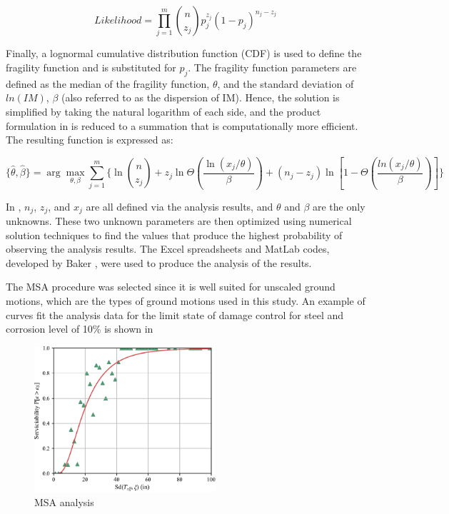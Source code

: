 \begin{equation}
   Likelihood=\prod_{j=1}^{m} \binom{n}{z_{j}}p_{j}^{z_{j}}(1-p_{j})^{n_{j}-z_{j}} 
   \label{eq:likelihood_MSA}
\end{equation}

Finally, a lognormal cumulative distribution function (CDF) is used to define the fragility function and is substituted for $p_j$. The fragility function parameters are defined as the median of the fragility function, $\theta$, and the standard deviation of $ln(IM)$, $\beta$ (also referred to as the dispersion of IM). Hence, the solution is simplified by taking the natural logarithm of each side, and the product formulation in is reduced to a summation that is computationally more efficient. The resulting function is expressed as:

\begin{equation}
  \{\hat{\theta},\hat{\beta}\}=\arg \max_{\theta,\beta} \sum_{j=1}^{m} \bigg\{\ln\binom{n}{z_{j}} +z_{j}\ln\Theta\left(\frac{\ln(x_{j}/\theta)}{\beta}\right) + (n_{j}-z_{j})\ln\left[1-\Theta\left(\frac{ln(x_{j}/\theta)}{\beta}\right)\right]\bigg\} 
  \label{eq:hat_theta_beta_MSA}
\end{equation}

In , $n_j$, $z_j$, and $x_j$ are all defined via the analysis results, and $\theta$ and $\beta$ are the only unknowns. These two unknown parameters are then optimized using numerical solution techniques to find the values that produce the highest probability of observing the analysis results. The Excel spreadsheets and MatLab codes, developed by Baker \cite{Baker2015}, were used to produce the analysis of the results.

The MSA procedure was selected since it is well suited for unscaled ground motions, which are the types of ground motions used in this study. An example of curves fit the analysis data for the limit state of damage control for steel and corrosion level of 10\% is shown in 

\begin{figure}[htp]
	\centering
	\includegraphics[width=0.60\textwidth]{VAC Thesis 2.0/Chapter-5/figs/MSA_Calc.pdf}
	\caption{MSA analysis}
	\label{fig:msa_sample_01}
\end{figure}

